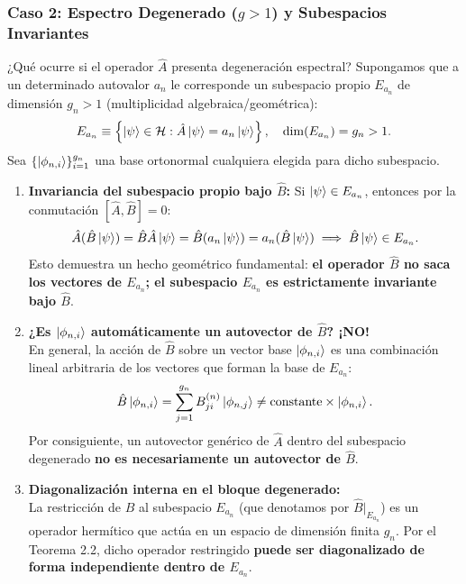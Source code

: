 \subsubsection{Caso 2: Espectro Degenerado ($g > 1$) y Subespacios Invariantes}

¿Qué ocurre si el operador $\hat{A}$ presenta degeneración espectral? Supongamos que a un determinado autovalor $a_n$ le corresponde un subespacio propio $E_{a_n}$ de dimensión $g_n > 1$ (multiplicidad algebraica/geométrica):
\begin{equation}
    E_{a_n} \equiv \left\{ \left| \psi \right\rangle \in \mathcal{H} : \hat{A}\left| \psi \right\rangle = a_n\left| \psi \right\rangle \right\}, \quad \dim(E_{a_n}) = g_n > 1.
\end{equation}
Sea $\{\left| \phi_{n, i} \right\rangle\}_{i=1}^{g_n}$ una base ortonormal cualquiera elegida para dicho subespacio.
\begin{enumerate}
    \item \textbf{Invariancia del subespacio propio bajo $\hat{B}$:}
    Si $\left| \psi \right\rangle \in E_{a_n}$, entonces por la conmutación $[\hat{A}, \hat{B}] = 0$:
    \begin{equation}
        \hat{A}(\hat{B}\left| \psi \right\rangle) = \hat{B}\hat{A}\left| \psi \right\rangle = \hat{B}(a_n\left| \psi \right\rangle) = a_n(\hat{B}\left| \psi \right\rangle) \implies \hat{B}\left| \psi \right\rangle \in E_{a_n}.
    \end{equation}
    Esto demuestra un hecho geométrico fundamental: \textbf{el operador $\hat{B}$ no saca los vectores de $E_{a_n}$; el subespacio $E_{a_n}$ es estrictamente invariante bajo $\hat{B}$}.
    \item \textbf{¿Es $\left| \phi_{n, i} \right\rangle$ automáticamente un autovector de $\hat{B}$? ¡NO!}\\
    En general, la acción de $\hat{B}$ sobre un vector base $\left| \phi_{n, i} \right\rangle$ es una combinación lineal arbitraria de los vectores que forman la base de $E_{a_n}$:
    \begin{equation}
        \hat{B}\left| \phi_{n, i} \right\rangle = \sum_{j=1}^{g_n} B_{ji}^{(n)} \left| \phi_{n, j} \right\rangle \neq \text{constante} \times \left| \phi_{n, i} \right\rangle.
    \end{equation}
    Por consiguiente, un autovector genérico de $\hat{A}$ dentro del subespacio degenerado \textbf{no es necesariamente un autovector de $\hat{B}$}.
    \item \textbf{Diagonalización interna en el bloque degenerado:}\\
    La restricción de $\hat{B}$ al subespacio $E_{a_n}$ (que denotamos por $\hat{B}|_{E_{a_n}}$) es un operador hermítico que actúa en un espacio de dimensión finita $g_n$. Por el Teorema 2.2, dicho operador restringido \textbf{puede ser diagonalizado de forma independiente dentro de $E_{a_n}$}.\\

\end{enumerate}
